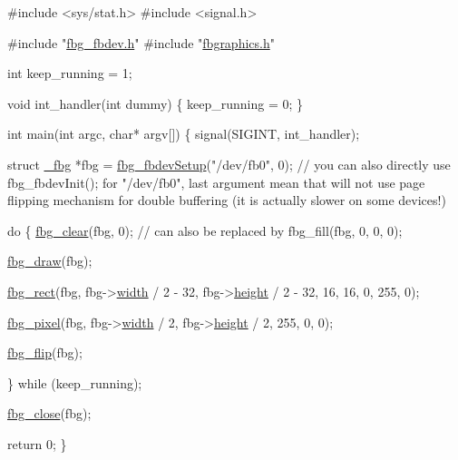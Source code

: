 \begin{DoxyCode}
\textcolor{preprocessor}{#include <sys/stat.h>}
\textcolor{preprocessor}{#include <signal.h>}

\textcolor{preprocessor}{#include "\hyperlink{fbg__fbdev_8h}{fbg\_fbdev.h}"}
\textcolor{preprocessor}{#include "\hyperlink{fbgraphics_8h}{fbgraphics.h}"}

\textcolor{keywordtype}{int} keep\_running = 1;

\textcolor{keywordtype}{void} int\_handler(\textcolor{keywordtype}{int} dummy) \{
    keep\_running = 0;
\}

\textcolor{keywordtype}{int} main(\textcolor{keywordtype}{int} argc, \textcolor{keywordtype}{char}* argv[]) \{
    signal(SIGINT, int\_handler);

    \textcolor{keyword}{struct }\hyperlink{struct__fbg}{\_fbg} *fbg = \hyperlink{fbg__fbdev_8h_a038c291213ab0fa68de9fadd0fb2d31e}{fbg\_fbdevSetup}(\textcolor{stringliteral}{"/dev/fb0"}, 0); \textcolor{comment}{// you can also directly use
       fbg\_fbdevInit(); for "/dev/fb0", last argument mean that will not use page flipping mechanism  for double
       buffering (it is actually slower on some devices!)}

    \textcolor{keywordflow}{do} \{
        \hyperlink{fbgraphics_8h_aab50cccf3eceac81bda220a0c09e38e0}{fbg\_clear}(fbg, 0); \textcolor{comment}{// can also be replaced by fbg\_fill(fbg, 0, 0, 0);}

        \hyperlink{fbgraphics_8h_a2dfb2f17bc31e161868e6baf1c391816}{fbg\_draw}(fbg);

        \hyperlink{fbgraphics_8h_ad208d61ec4f50a5fd13f2cc8dd2ee0e5}{fbg\_rect}(fbg, fbg->\hyperlink{struct__fbg_a1d3c76643e4ee424f4d17e27991d5e2e}{width} / 2 - 32, fbg->\hyperlink{struct__fbg_a3a3bd409e71d020fa77f69a541d832f8}{height} / 2 - 32, 16, 16, 0, 255, 0);

        \hyperlink{fbgraphics_8h_a7d81b1ddf54b0d4da0f30e36d7e2f3bb}{fbg\_pixel}(fbg, fbg->\hyperlink{struct__fbg_a1d3c76643e4ee424f4d17e27991d5e2e}{width} / 2, fbg->\hyperlink{struct__fbg_a3a3bd409e71d020fa77f69a541d832f8}{height} / 2, 255, 0, 0);

        \hyperlink{fbgraphics_8h_aedfec23bc4c51ff5ffb843bb289d448b}{fbg\_flip}(fbg);

    \} \textcolor{keywordflow}{while} (keep\_running);

    \hyperlink{fbgraphics_8h_a390cd3fb535cbad76856700a035ed401}{fbg\_close}(fbg);

    \textcolor{keywordflow}{return} 0;
\}
\end{DoxyCode}


